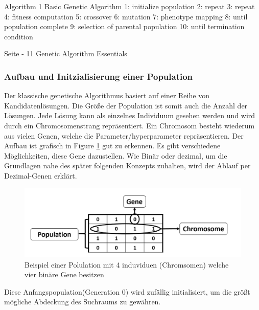 Algorithm 1 Basic Genetic Algorithm
1: initialize population
2: repeat
3: 		repeat
4:			fitness computation
5:			crossover
6:			mutation
7:			phenotype mapping
8:		until population complete
9:		selection of parental population
10: until termination condition

Seite - 11 Genetic Algorithm Essentials
\fi 

\subsubsection{Aufbau und Initzialisierung einer Population}
Der klassische genetische Algorithmus basiert auf einer Reihe von Kandidatenlösungen. Die Größe der Population ist somit auch die Anzahl der Lösungen. Jede Lösung kann als einzelnes Individuum gesehen werden und wird durch ein Chromosomenstrang repräsentiert. Ein Chromosom besteht wiederum aus vielen Genen, welche die Parameter/hyperparameter repräsentieren. Der Aufbau ist grafisch in Figure \ref{fig:chromosome} gut zu erkennen. Es gibt verschiedene Möglichkeiten, diese Gene dazustellen. Wie Binär oder dezimal, um die Grundlagen nahe des später folgenden Konzepts zuhalten, wird der Ablauf per Dezimal-Genen erklärt.

\noindent%
\begin{figure}[H]
  \centering  
  \includegraphics[scale=0.3]{img/Chromsome-s134-PracticalComputerVion.png}
  \caption{Beispiel einer Polulation mit 4 induviduen (Chromsomen) welche vier binäre Gene besitzen \cite{Rashid2017} }
  \label{fig:chromosome}
\end{figure}

Diese Anfangspopulation(Generation 0) wird zufällig initialisiert, um die größt mögliche Abdeckung des Suchraums zu gewähren. 

